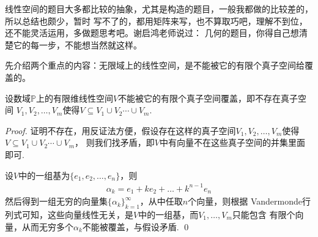 线性空间的题目大多都比较的抽象，尤其是构造的题目，一般我都做的比较差的，所以总结也颇少，暂时
写不了的，都用矩阵来写，也不算取巧吧，理解不到位，还不能灵活运用，多做题思考吧。谢启鸿老师说过：
几何的题目，你得自己想清楚它的每一步，不能想当然就这样。

先介绍两个重点的内容：无限域上的线性空间，是不能被它的有限个真子空间给覆盖的。

\begin{proposition}[有限子覆盖]
	设数域$\mathbb{P}$上的有限维线性空间$V$不能被它的有限个真子空间覆盖，即不存在真子空间
	$V_1, V_2, \dots, V_m$使得$V \subseteq V_1 \cup  V_2 \cdots \cup  V_m$.
\end{proposition}

\begin{proof}
	证明不存在，用反证法方便，假设存在这样的真子空间$V_1, V_2, \dots, V_m$使得$V \subseteq V_1 \cup  V_2 \cdots \cup  V_m$，
	则我们找矛盾，即$V$中有向量不在这些真子空间的并集里面即可.

	设$V$中的一组基为$\{ e_1, e_2, \dots, e_n \}$，则
	\begin{align*}
		\alpha_k = e_1 + k e_2 + \dots + k^{n-1} e_n
	\end{align*}
	然后得到一组无穷的向量集$\{ \alpha_k \}_{k=1}^\infty$，从中任取$n$个向量，则根据
	Vandermonde行列式可知，这些向量线性无关，是$V$中的一组基，而$V_1,\dots,V_m$只能包含
	有限个向量，从而无穷多个$\alpha_k$不能被覆盖，与假设矛盾. 
	\qed{}
\end{proof}